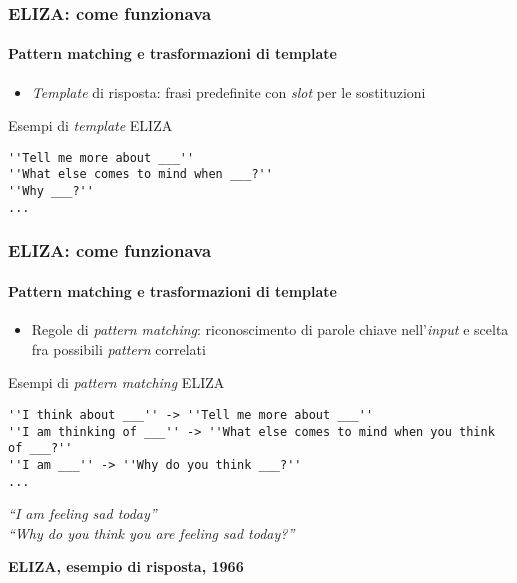 %
\begin{frame}[t,fragile] \frametitle{ELIZA: come funzionava}
	{\small
		\framesubtitle{Pattern matching e trasformazioni di template}
		\begin{itemize}[leftmargin=10pt,align=right]
			\item[\alert{\faArrowCircleRight}] \alert{\textit{Template} di risposta:} frasi predefinite con \textit{slot} per le sostituzioni
		\end{itemize}
		\vspace*{.3cm}
		\hspace*{4cm}
		\begin{codeblock}{Esempi di \textit{template} ELIZA}
        	\begin{verbatim}
''Tell me more about ___''
''What else comes to mind when ___?''
''Why ___?''
...
        	\end{verbatim}
    	\end{codeblock}
	}
\end{frame}
%
\begin{frame}[t,fragile] \frametitle{ELIZA: come funzionava}
	\framesubtitle{Pattern matching e trasformazioni di template}
	{\small
		\begin{itemize}[leftmargin=10pt,align=right]
			\item[\alert{\faArrowCircleRight}] \alert{Regole di \textit{pattern matching}:} riconoscimento di parole chiave nell'\textit{input} e scelta fra possibili \textit{pattern} correlati
		\end{itemize}
		\vspace*{.3cm}
		\begin{codeblock}{Esempi di \textit{pattern matching} ELIZA}
        	\begin{verbatim}
''I think about ___'' -> ''Tell me more about ___''
''I am thinking of ___'' -> ''What else comes to mind when you think of ___?''
''I am ___'' -> ''Why do you think ___?''
...
        	\end{verbatim}
    	\end{codeblock}
		\hspace*{4cm}
		\begin{minipage}[t]{.6\textwidth}
			\renewcommand{\epigraphsize}{\scriptsize}
			\setlength{\afterepigraphskip}{0pt}
			\setlength{\beforeepigraphskip}{5pt}
			\setlength{\epigraphwidth}{0.9\textwidth}
			\epigraph{\textit{\alert{\faUser} ``\alert{I am} feeling sad today''\\
			\alert{\faTerminal} ``Why do you think you are feeling sad today?''}}{\textbf{ELIZA, esempio di risposta, 1966}}
		\end{minipage}
	}
\end{frame}

